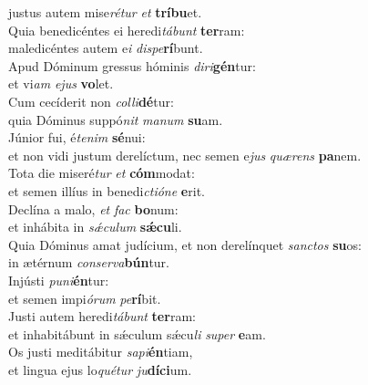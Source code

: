 \evenverse justus autem mise\textit{ré}\textit{tur} \textit{et} \textbf{trí}\textbf{bu}et.\\
\oddverse Quia benedicéntes ei heredi\textit{tá}\textit{bunt} \textbf{ter}ram:~\*\\
\oddverse maledicéntes autem e\textit{i} \textit{di}\textit{spe}\textbf{rí}bunt.\\
\evenverse Apud Dóminum gressus hóminis \textit{di}\textit{ri}\textbf{gén}tur:~\*\\
\evenverse et vi\textit{am} \textit{e}\textit{jus} \textbf{vo}let.\\
\oddverse Cum cecíderit non \textit{col}\textit{li}\textbf{dé}tur:~\*\\
\oddverse quia Dóminus suppó\textit{nit} \textit{ma}\textit{num} \textbf{su}am.\\
\evenverse Júnior fui, é\textit{te}\textit{nim} \textbf{sé}nui:~\*\\
\evenverse et non vidi justum derelíctum, nec semen e\textit{jus} \textit{quæ}\textit{rens} \textbf{pa}nem.\\
\oddverse Tota die miseré\textit{tur} \textit{et} \textbf{cóm}modat:~\*\\
\oddverse et semen illíus in benedi\textit{cti}\textit{ó}\textit{ne} \textbf{e}rit.\\
\evenverse Declína a malo, \textit{et} \textit{fac} \textbf{bo}num:~\*\\
\evenverse et inhábita in \textit{sǽ}\textit{cu}\textit{lum} \textbf{sǽ}\textbf{cu}li.\\
\oddverse Quia Dóminus amat judícium, et non derelínquet \textit{san}\textit{ctos} \textbf{su}os:~\*\\
\oddverse in ætérnum \textit{con}\textit{ser}\textit{va}\textbf{bún}tur.\\
\evenverse Injústi \textit{pu}\textit{ni}\textbf{én}tur:~\*\\
\evenverse et semen impi\textit{ó}\textit{rum} \textit{pe}\textbf{rí}bit.\\
\oddverse Justi autem heredi\textit{tá}\textit{bunt} \textbf{ter}ram:~\*\\
\oddverse et inhabitábunt in sǽculum sǽcu\textit{li} \textit{su}\textit{per} \textbf{e}am.\\
\evenverse Os justi meditábitur \textit{sa}\textit{pi}\textbf{én}tiam,~\*\\
\evenverse et lingua ejus lo\textit{qué}\textit{tur} \textit{ju}\textbf{dí}\textbf{ci}um.\\
